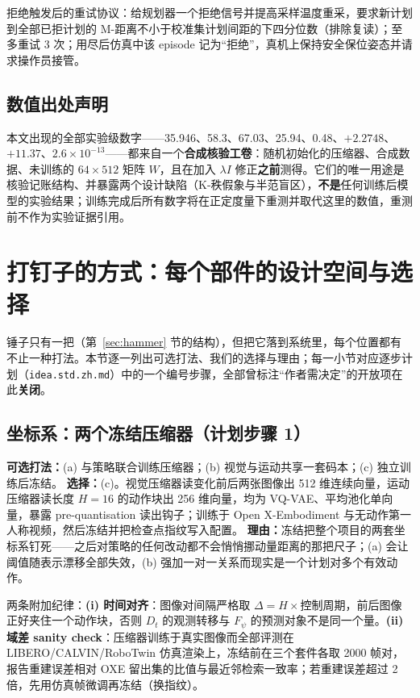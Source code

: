 \documentclass[11pt,a4paper]{ctexart}
\newcommand{\Dt}{D_t}
\begin{document}
拒绝触发后的重试协议：给规划器一个拒绝信号并提高采样温度重采，要求新计划到全部已拒计划的 M-距离不小于校准集计划间距的下四分位数（排除复读）；至多重试 3 次；用尽后仿真中该 episode 记为``拒绝''，真机上保持安全保位姿态并请求操作员接管。

\subsection{数值出处声明}\label{sec:provenance}

\begin{tcolorbox}[notebox]
本文出现的全部实验级数字——35.946、58.3、67.03、25.94、0.48、$+2.2748$、$+11.37$、$2.6\times10^{-13}$——都来自一个\textbf{合成核验工卷}：随机初始化的压缩器、合成数据、未训练的 $64\times512$ 矩阵 $W$，且在加入 $\lambda I$ 修正\textbf{之前}测得。它们的唯一用途是核验记账结构、并暴露两个设计缺陷（K-秩假象与半范盲区），\textbf{不是}任何训练后模型的实验结果；训练完成后所有数字将在正定度量下重测并取代这里的数值，重测前不作为实验证据引用。
\end{tcolorbox}

\section{打钉子的方式：每个部件的设计空间与选择}\label{sec:drive}

锤子只有一把（第~\ref{sec:hammer} 节的结构），但把它落到系统里，每个位置都有不止一种打法。本节逐一列出可选打法、我们的选择与理由；每一小节对应逐步计划（\texttt{idea.std.zh.md}）中的一个编号步骤，全部曾标注``作者需决定''的开放项在此\textbf{关闭}。

\subsection{坐标系：两个冻结压缩器（计划步骤 1）}

\textbf{可选打法：}(a) 与策略联合训练压缩器；(b) 视觉与运动共享一套码本；(c) 独立训练后冻结。\quad
\textbf{选择：}(c)。视觉压缩器读变化前后两张图像出 512 维连续向量，运动压缩器读长度 $H{=}16$ 的动作块出 256 维向量，均为 VQ-VAE、平均池化单向量，暴露 pre-quantisation 读出钩子；训练于 Open X-Embodiment 与无动作第一人称视频，然后冻结并把检查点指纹写入配置。\quad
\textbf{理由：}冻结把整个项目的两套坐标系钉死——之后对策略的任何改动都不会悄悄挪动量距离的那把尺子；(a) 会让阈值随表示漂移全部失效，(b) 强加一对一关系而现实是一个计划对多个有效动作。

两条附加纪律：\textbf{(i) 时间对齐}：图像对间隔严格取 $\Delta=H\times$控制周期，前后图像正好夹住一个动作块，否则 $\Dt$ 的观测转移与 $F_\psi$ 的预测对象不是同一个量。\textbf{(ii) 域差 sanity check}：压缩器训练于真实图像而全部评测在 LIBERO/CALVIN/RoboTwin 仿真渲染上，冻结前在三个套件各取 2000 帧对，报告重建误差相对 OXE 留出集的比值与最近邻检索一致率；若重建误差超过 2 倍，先用仿真帧微调再冻结（换指纹）。
\end{document}
